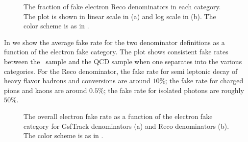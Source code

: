 \documentclass{cmspaper}
\begin{document}
\begin{figure}[htb]
\begin{center}
   \caption{The fraction of fake electron Reco denominators in each category. The plot is shown in linear scale in (a) and log scale in (b). The color scheme is as in .}
   \label{fig:ElectronRecoDenominatorFakeCategory}
\end{center}
\end{figure}

In  we show the average fake rate for the two denominator definitions as a function of the electron fake category. The plot shows consistent fake rates between the \WPlusJets\ sample and the QCD sample when one separates into the various categories. For the Reco denominator, the fake rate for semi leptonic decay of heavy flavor hadrons and \pizero conversions are around $10\%$; the fake rate for charged pions and kaons are around $0.5\%$; the fake rate for isolated photons are roughly $50\%$.

\begin{figure}[htb]
\begin{center}
   \caption{The overall electron fake rate as a function of the electron fake category for GsfTrack denominators (a) and Reco denominators (b). The color scheme is as in .}
   \label{fig:ElectronFakeRate_FakeCategory}
\end{center}
\end{figure}
\end{document}
